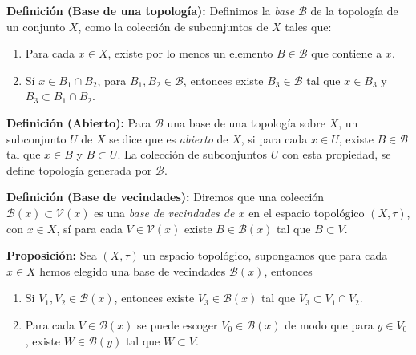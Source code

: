


\textbf{Definición (Base de una topología):} Definimos la \textit{base} $\mathcal{B}$ de la topología de un conjunto $X$, como la colección de subconjuntos de $X$ tales que:
\begin{enumerate}
    \item Para cada $x\in X$, existe por lo menos un elemento $B\in\mathcal{B}$ que contiene a $x$.
    \item Sí $x\in B_1\cap B_2$, para $B_1,B_2\in\mathcal{B}$, entonces existe $B_3\in\mathcal{B}$ tal que $x\in B_3$ y $B_3\subset B_1\cap B_2$.
\end{enumerate}

\textbf{Definición (Abierto):} Para $\mathcal{B}$ una base de una topología sobre $X$, un subconjunto $U$ de $X$ se dice que es \textit{abierto} de $X$, si para cada $x\in U$, existe $B\in\mathcal{B}$ tal que $x\in B$ y $B\subset U$. La colección de subconjuntos $U$ con esta propiedad, se define topología generada por $\mathcal{B}$.

\textbf{Definición (Base de vecindades):} Diremos que una colección $\mathcal{B}(x)\subset\mathcal{V}(x)$ es una \textit{base de vecindades de $x$} en el espacio topológico $(X,\tau)$, con $x\in X$, sí para cada $V\in\mathcal{V}(x)$ existe $B\in\mathcal{B}(x)$ tal que $B\subset V$.

\textbf{Proposición:} Sea $(X,\tau)$ un espacio topológico, supongamos que para cada $x\in X$ hemos elegido una base de vecindades $\mathcal{B}(x)$, entonces
\begin{enumerate}
    \item Si $V_1,V_2\in\mathcal{B}(x)$, entonces existe $V_3\in\mathcal{B}(x)$ tal que $V_3\subset V_1\cap V_2$.
    \item Para cada $V\in\mathcal{B}(x)$ se puede escoger $V_0\in\mathcal{B}(x)$ de modo que para $y\in V_0$, existe $W\in\mathcal{B}(y)$ tal que $W\subset V$.
\end{enumerate}


